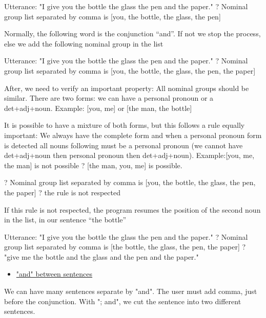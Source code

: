 \documentclass[twoside,a4paper,10pt]{report}
\begin{document}
\small
\begin{verbatimtab}
  Utterance: "I give you the bottle the glass the pen and the paper." 
  ? Nominal group list separated by comma is [you, the bottle, the glass, the pen]
\end{verbatimtab}
\normalsize
Normally, the following word is the conjunction “and”. If not we stop the process, else we add the following nominal group in the list


\small
\begin{verbatimtab}
  Utterance: "I give you the bottle the glass the pen and the paper." 
  ? Nominal group list separated by comma is [you, the bottle, the glass, the pen, the paper]
\end{verbatimtab}
\normalsize
After, we need to verify an important property: All nominal groups should be similar. There are two forms: we can have a personal pronoun or a det+adj+noun. Example: [you, me] or [the man, the bottle] 

It is possible to have a mixture of both forms, but this follows a rule equally important: We always have the complete form and when a personal pronoun form is detected all nouns following must be a personal pronoun (we cannot have det+adj+noun then personal pronoun then det+adj+noun). Example:[you, me, the man] is not possible ? [the man, you, me] is possible.


\small
\begin{verbatimtab}
  ? Nominal group list separated by comma is [you, the bottle, the glass, the pen, the paper] 
  ? the rule is not respected
\end{verbatimtab}
\normalsize

If this rule is not respected, the program resumes the position of the second noun in the list, in our sentence “the bottle”


\small
\begin{verbatimtab}
  Utterance: "I give you the bottle the glass the pen and the paper." 
  ? Nominal group list separated by comma is [the bottle, the glass, the pen, the paper]
  ? "give me the bottle and the glass and the pen and the paper."
\end{verbatimtab}
\normalsize

\begin{itemize}
    \item  \underline{"and" between sentences}
\end{itemize}
We can have many sentences separate by "and". The user must add comma, just before the conjunction. With "; and", we cut the sentence into two different sentences.
\end{document}
